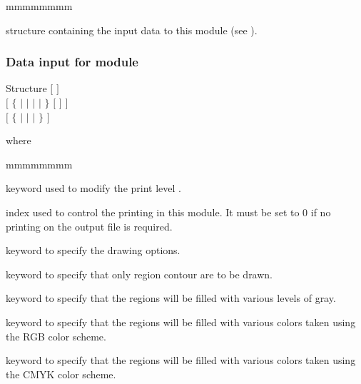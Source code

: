 \begin{GuideUpdate}{3.04}
\begin{ListeDeDescription}{mmmmmmmm}
\item[\dstr{descpsp}] structure containing the input data to this module (see ).

\end{ListeDeDescription}


\subsubsection{Data input for module }\label{sect:descpsp}

\begin{DataStructure}{Structure }
$[$   $]$ \\
$[$  $\{$  $|$  $|$  $|$  $|$  $\}$ 
$[$  $]$ $]$\\
$[$  $\{$   $|$  $|$  $|$  $\}$ $]$ 
\end{DataStructure}

\noindent
where

\begin{ListeDeDescription}{mmmmmmmm}   

\item[\moc{EDIT}] keyword used to modify the print level .

\item[\dusa{iprint}] index used to control the printing in this module.
It must be set to 0 if no printing on the output file is required. 

\item[\moc{FILL}] keyword to specify the drawing options.

\item[\moc{NONE}] keyword to specify that only region contour are to be
drawn.                                                                            

\item[\moc{GRAY}] keyword to specify that the regions will be filled with various levels of
gray.                                                                            

\item[\moc{RGB}] keyword to specify that the regions will be filled with various colors taken using
the RGB color scheme.                                                                            

\item[\moc{CMYK}] keyword to specify that the regions will be filled with various colors taken
using the CMYK color scheme. 


\end{ListeDeDescription}
\end{GuideUpdate}
